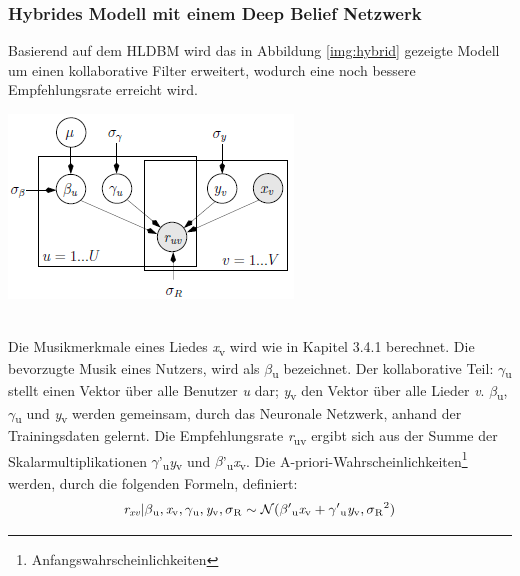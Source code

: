 \documentclass[twosided,a4,10pt]{article}
\begin{document}
\begin{multicols}{2}
		\subsubsection{Hybrides Modell mit einem Deep Belief Netzwerk}
		Basierend auf dem HLDBM wird das in Abbildung \ref{img:hybrid} gezeigte Modell um einen kollaborative Filter erweitert, wodurch eine noch bessere Empfehlungsrate erreicht wird.
		\begin{minipage}{0.45\textwidth}
			\centering
			\includegraphics{img/hybrid.png}
			\label{img:hybrid}
		\end{minipage}\newline\\
		Die Musikmerkmale eines Liedes \textit{x}\textsubscript{v} wird wie in Kapitel 3.4.1 berechnet. Die bevorzugte Musik eines Nutzers, wird als $\beta$\textsubscript{u} bezeichnet. Der kollaborative Teil: $\gamma$\textsubscript{u} stellt einen Vektor über alle Benutzer \textit{u} dar; \textit{y}\textsubscript{v} den Vektor über alle Lieder \textit{v}. $\beta$\textsubscript{u}, $\gamma$\textsubscript{u} und \textit{y}\textsubscript{v} werden gemeinsam, durch das Neuronale Netzwerk, anhand der Trainingsdaten gelernt. Die Empfehlungsrate \textit{r}\textsubscript{uv} ergibt sich aus der Summe der Skalarmultiplikationen  $\gamma$'\textsubscript{u}\textit{y}\textsubscript{v} und  $\beta$'\textsubscript{u}\textit{x}\textsubscript{v}. Die A-priori-Wahrscheinlichkeiten\footnote[20]{Anfangswahrscheinlichkeiten} werden, durch die folgenden Formeln, definiert:\newline
		\begin{equation*}
		\centering
		\textit{r\textsubscript{xv}}|\beta\textsubscript{u},\textit{x}\textsubscript{v},\gamma\textsubscript{u},\textit{y}\textsubscript{v},\sigma\textsubscript{R}\sim\mathcal{N}(\beta'\textsubscript{u}\textit{x}\textsubscript{v} + \gamma'\textsubscript{u}\textit{y}\textsubscript{v},\sigma\textsubscript{R}\textsuperscript{2})
		\end{equation*}

\end{multicols}
\end{document}
